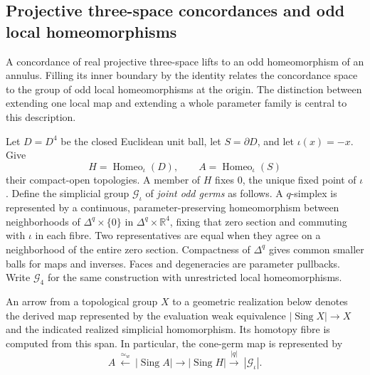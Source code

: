 \subsection{Projective three-space concordances and odd local homeomorphisms}

A concordance of real projective three-space lifts to an odd
homeomorphism of an annulus.  Filling its inner boundary by the
identity relates the concordance space to the group of odd local
homeomorphisms at the origin.  The distinction between extending
one local map and extending a whole parameter family is central
to this description.

Let $D=D^4$ be the closed Euclidean unit ball, let $S=\partial D$,
and let $\iota(x)=-x$.  Give
\[
 H=\operatorname{Homeo}_{\iota}(D),\qquad
 A=\operatorname{Homeo}_{\iota}(S)
\]
their compact-open topologies.  A member of $H$ fixes $0$, the
unique fixed point of $\iota$.  Define the simplicial group
$\mathcal G_{\iota}$ of \emph{joint odd germs} as follows.
A $q$-simplex is represented by a continuous, parameter-preserving
homeomorphism between neighborhoods of
$\Delta^q\times\{0\}$ in $\Delta^q\times\mathbb R^4$,
fixing that zero section and commuting with $\iota$ in each fibre.
Two representatives are equal when they agree on a neighborhood
of the entire zero section.  Compactness of $\Delta^q$ gives
common smaller balls for maps and inverses.  Faces and
degeneracies are parameter pullbacks.  Write $\mathcal G_4$
for the same construction with unrestricted local homeomorphisms.

An arrow from a topological group $X$ to a geometric realization
below denotes the derived map represented by the evaluation weak
equivalence $|\operatorname{Sing}X|\to X$ and the indicated realized
simplicial homomorphism.  Its homotopy fibre is computed from this
span.  In particular, the cone-germ map is represented by
\[
 A\ \xleftarrow{\simeq_w}\ |\operatorname{Sing}A|
 \longrightarrow |\operatorname{Sing}H|
 \xrightarrow{|q|}\ |\mathcal G_{\iota}|.
\]

